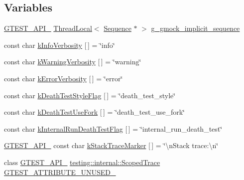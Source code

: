 \subsection*{Variables}
\begin{DoxyCompactItemize}
\item 
\hyperlink{gtest-port_8h_aa73be6f0ba4a7456180a94904ce17790}{G\+T\+E\+S\+T\+\_\+\+A\+P\+I\+\_\+} \hyperlink{classtesting_1_1internal_1_1ThreadLocal}{Thread\+Local}$<$ \hyperlink{classtesting_1_1Sequence}{Sequence} $\ast$ $>$ \hyperlink{namespacetesting_1_1internal_af4407fe8aeb1e43b2f58940736a20590}{g\+\_\+gmock\+\_\+implicit\+\_\+sequence}
\item 
const char \hyperlink{namespacetesting_1_1internal_a96274a788ffc75a6dffdfa8aa1f34fb9}{k\+Info\+Verbosity} \mbox{[}$\,$\mbox{]} = \char`\"{}info\char`\"{}
\item 
const char \hyperlink{namespacetesting_1_1internal_ad9386ccda6b6deac2f7b84784d3088c0}{k\+Warning\+Verbosity} \mbox{[}$\,$\mbox{]} = \char`\"{}warning\char`\"{}
\item 
const char \hyperlink{namespacetesting_1_1internal_a3d730761274e7b80dd66e5014171fcb5}{k\+Error\+Verbosity} \mbox{[}$\,$\mbox{]} = \char`\"{}error\char`\"{}
\item 
const char \hyperlink{namespacetesting_1_1internal_a008ebfe0c0347d65e5e06e4d310981b3}{k\+Death\+Test\+Style\+Flag} \mbox{[}$\,$\mbox{]} = \char`\"{}death\+\_\+test\+\_\+style\char`\"{}
\item 
const char \hyperlink{namespacetesting_1_1internal_a32051e2574562b548be3e26a52eaa553}{k\+Death\+Test\+Use\+Fork} \mbox{[}$\,$\mbox{]} = \char`\"{}death\+\_\+test\+\_\+use\+\_\+fork\char`\"{}
\item 
const char \hyperlink{namespacetesting_1_1internal_a8572303d929880adf30db00952e1c45d}{k\+Internal\+Run\+Death\+Test\+Flag} \mbox{[}$\,$\mbox{]} = \char`\"{}internal\+\_\+run\+\_\+death\+\_\+test\char`\"{}
\item 
\hyperlink{gtest-port_8h_aa73be6f0ba4a7456180a94904ce17790}{G\+T\+E\+S\+T\+\_\+\+A\+P\+I\+\_\+} const char \hyperlink{namespacetesting_1_1internal_abb38528ca6a45df265b19f5ccb3d16d9}{k\+Stack\+Trace\+Marker} \mbox{[}$\,$\mbox{]} = \char`\"{}\textbackslash{}n\+Stack trace\+:\textbackslash{}n\char`\"{}
\item 
class \hyperlink{gtest-port_8h_aa73be6f0ba4a7456180a94904ce17790}{G\+T\+E\+S\+T\+\_\+\+A\+P\+I\+\_\+} \hyperlink{classtesting_1_1internal_1_1ScopedTrace}{testing\+::internal\+::\+Scoped\+Trace} \hyperlink{namespacetesting_1_1internal_a581ac897511489c75a06aa328dcfb62f}{G\+T\+E\+S\+T\+\_\+\+A\+T\+T\+R\+I\+B\+U\+T\+E\+\_\+\+U\+N\+U\+S\+E\+D\+\_\+}

\end{DoxyCompactItemize}
